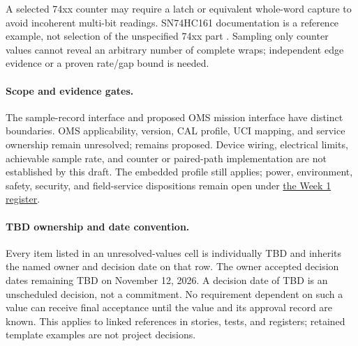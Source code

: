 A selected 74xx counter may require a latch or equivalent whole-word capture
to avoid incoherent multi-bit readings. SN74HC161 documentation is a reference
example, not selection of the unspecified 74xx part \cite{TICounter161}.
Sampling only counter values cannot reveal an arbitrary number of complete
wraps; independent edge evidence or a proven rate/gap bound is needed.

\paragraph{Scope and evidence gates.}
The sample-record interface and proposed OMS mission interface have distinct
boundaries. OMS applicability, version, CAL profile, UCI mapping, and service
ownership remain unresolved;  remains proposed.
Device wiring, electrical limits, achievable sample rate, and counter or
paired-path implementation are not established by this draft. The embedded
profile still applies; power, environment, safety, security, and field-service
dispositions remain open under \hyperref[Table:WeekOneTBDs]{the Week 1 register}.

\paragraph{TBD ownership and date convention.}
Every item listed in an unresolved-values cell is individually TBD and
inherits the named owner and decision date on that row. The owner accepted
decision dates remaining TBD on November 12, 2026. A decision date of TBD is
an unscheduled decision, not a commitment. No requirement dependent on such
a value can receive final acceptance until the value and its approval record
are known. This applies to linked references in stories, tests, and registers;
retained template examples are not project decisions.

